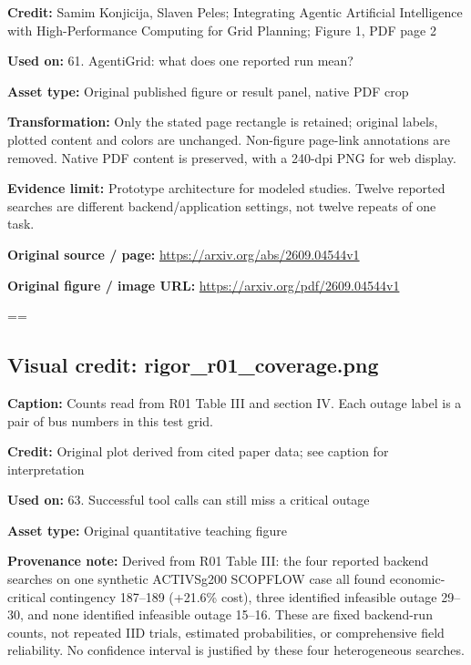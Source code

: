\documentclass[10pt,letterpaper]{article}
\begin{document}
\textbf{Credit:} Samim Konjicija, Slaven Peles; Integrating Agentic Artificial Intelligence with High-Performance Computing for Grid Planning; Figure 1, PDF page 2\par
\textbf{Used on:} 61. AgentiGrid: what does one reported run mean?\par
\textbf{Asset type:} Original published figure or result panel, native PDF crop\par
\textbf{Transformation:} Only the stated page rectangle is retained; original labels, plotted content and colors are unchanged. Non-figure page-link annotations are removed. Native PDF content is preserved, with a 240-dpi PNG for web display.\par
\textbf{Evidence limit:} Prototype architecture for modeled studies. Twelve reported searches are different backend/application settings, not twelve repeats of one task.\par
\textbf{Original source / page:} \href{https://arxiv.org/abs/2609.04544v1}{\small\ttfamily https:/\allowbreak{}/\allowbreak{}arxiv.\allowbreak{}org/\allowbreak{}abs/\allowbreak{}2609.\allowbreak{}04544v1}\par
\textbf{Original figure / image URL:} \href{https://arxiv.org/pdf/2609.04544v1}{\small\ttfamily https:/\allowbreak{}/\allowbreak{}arxiv.\allowbreak{}org/\allowbreak{}pdf/\allowbreak{}2609.\allowbreak{}04544v1}\par
\egroup\par\noindent\box\readingEntry\par\medskip
\setbox\readingEntry=\vbox\bgroup\hsize=\linewidth\subsection*{Visual credit: rigor\_r01\_coverage.png}
\textbf{Caption:} Counts read from R01 Table III and section IV. Each outage label is a pair of bus numbers in this test grid.\par
\textbf{Credit:} Original plot derived from cited paper data; see caption for interpretation\par
\textbf{Used on:} 63. Successful tool calls can still miss a critical outage\par
\textbf{Asset type:} Original quantitative teaching figure\par
\textbf{Provenance note:} Derived from R01 Table III: the four reported backend searches on one synthetic ACTIVSg200 SCOPFLOW case all found economic-critical contingency 187--189 (+21.6\% cost), three identified infeasible outage 29--30, and none identified infeasible outage 15--16. These are fixed backend-run counts, not repeated IID trials, estimated probabilities, or comprehensive field reliability. No confidence interval is justified by these four heterogeneous searches.\par
\end{document}
